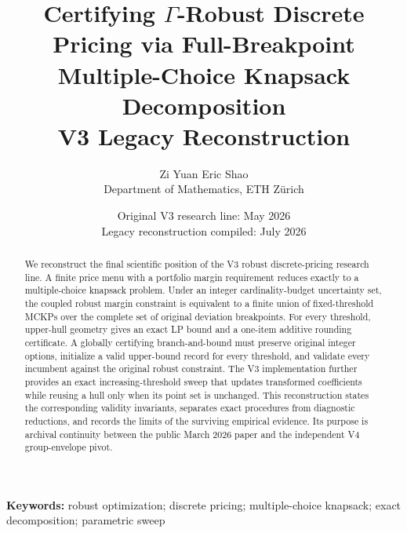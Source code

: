 \documentclass[11pt,a4paper]{article}
\title{Certifying $\Gamma$-Robust Discrete Pricing via Full-Breakpoint\\
Multiple-Choice Knapsack Decomposition\\[0.7em]
\large V3 Legacy Reconstruction}
\author{Zi Yuan Eric Shao\\
\small Department of Mathematics, ETH Z\"urich}
\date{Original V3 research line: May 2026\\
Legacy reconstruction compiled: July 2026}
\theoremstyle{definition}
\theoremstyle{remark}
\begin{document}
\maketitle

\begin{center}
\end{center}

\begin{abstract}
We reconstruct the final scientific position of the V3 robust discrete-pricing
research line. A finite price menu with a portfolio margin requirement reduces
exactly to a multiple-choice knapsack problem. Under an integer
cardinality-budget uncertainty set, the coupled robust margin constraint is
equivalent to a finite union of fixed-threshold MCKPs over the complete set of
original deviation breakpoints. For every threshold, upper-hull geometry gives
an exact LP bound and a one-item additive rounding certificate. A globally
certifying branch-and-bound must preserve original integer options, initialize
a valid upper-bound record for every threshold, and validate every incumbent
against the original robust constraint. The V3 implementation further provides
an exact increasing-threshold sweep that updates transformed coefficients while
reusing a hull only when its point set is unchanged. This reconstruction states
the corresponding validity invariants, separates exact procedures from
diagnostic reductions, and records the limits of the surviving empirical
evidence. Its purpose is archival continuity between the public March 2026
paper and the independent V4 group-envelope pivot.
\end{abstract}

\noindent\textbf{Keywords:} robust optimization; discrete pricing;
multiple-choice knapsack; exact decomposition; parametric sweep
\end{document}
